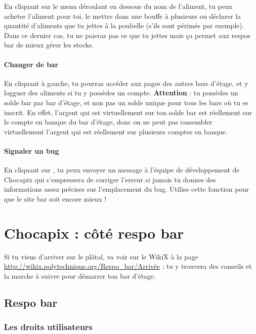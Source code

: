 \documentclass[12pt,french]{article}
\begin{document}
En cliquant sur le menu déroulant en dessous du nom de l'aliment, tu peux acheter l'aliment pour toi, le mettre dans une bouffe à plusieurs ou déclarer la quantité d'aliments que tu jettes à la poubelle (s'ils sont périmés par exemple). Dans ce dernier cas, tu ne paieras pas ce que tu jettes mais ça permet aux respos bar de mieux gérer les stocks.

\paragraph{Changer de bar} En cliquant  à gauche, tu pourras accéder aux pages des autres bars d'étage, et y logguer des aliments si tu y possèdes un compte. \textbf{Attention} : tu possèdes un solde bar par bar d'étage, et non pas un solde unique pour tous les bars où tu es inscrit. En effet, l'argent qui est virtuellement sur ton solde bar est réellement sur le compte en banque du bar d'étage, donc on ne peut pas rassembler virtuellement l'argent qui est réellement sur plusieurs comptes en banque.

\paragraph{Signaler un bug} En cliquant sur , tu peux envoyer un message à l'équipe de développement de Chocapix qui s'empressera de corriger l'erreur si jamais tu donnes des informations assez précises sur l'emplacement du bug. Utilise cette fonction pour que le site bar soit encore mieux !


\section{Chocapix : côté respo bar}

Si tu viens d'arriver sur le plâtal, va voir sur le WikiX à la page \url{http://wikix.polytechnique.org/Respo_bar/Arrivée} ; tu y trouvera des conseils et la marche à suivre pour démarrer ton bar d'étage.

\subsection{Respo bar}

\subsubsection{Les droits utilisateurs}
\end{document}
